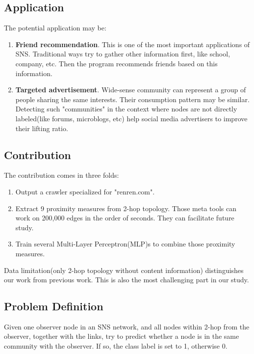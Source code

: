 \documentclass[11pt,a4paper]{article}
\begin{document}
\subsection{Application}

The potential application may be:
\begin{enumerate}
	\item \textbf{Friend recommendation}. This is one of the 
	most important applications of SNS. Traditional ways
	try to gather other information first, like school, company, etc. 
	Then the program recommends friends based on this information.  
	\item \textbf{Targeted advertisement}. Wide-sense community 
	can represent a group of people sharing the same interests. Their
	consumption pattern may be similar. Detecting such "communities"
	in the context where nodes are not directly labeled(like forums, 
	microblogs, etc) help social media advertisers to improve 
	their lifting ratio. 
\end{enumerate}

\subsection{Contribution}

The contribution comes in three folds:
\begin{enumerate}
	\item Output a crawler specialized for "renren.com". 
	\item Extract 9 proximity measures from 2-hop topology. 
	Those meta tools can work on 200,000 edges in the order 
	of seconds. They can facilitate future study. 
	\item Train several Multi-Layer Perceptron(MLP)s to 
	combine those proximity measures. 
\end{enumerate}

Data limitation(only 2-hop topology without content information)
distinguishes our work from previous work. This is also 
the most challenging part in our study. 

\subsection{Problem Definition}

Given one observer node in an SNS network, and 
all nodes within 2-hop from the observer, together 
with the links, try to predict whether a node is 
in the same community with the observer. If so, 
the class label is set to 1, otherwise 0. 
\end{document}
